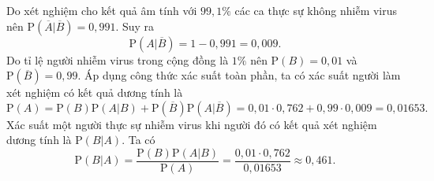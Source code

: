 \begin{vd}
{		Do xét nghiệm cho kết quả âm tính với $99,1\%$ các ca thực sự không nhiễm virus nên
		$\mathrm{P}(\overline{A}|\overline{B})=0{,}991$. Suy ra $$\mathrm{P}(A|\overline{B})=1-0{,}991=0{,}009.$$
		Do tỉ lệ người nhiễm virus trong cộng đồng là $1\%$ nên $\mathrm{P}(B)=0,01$ và $\mathrm{P}(\overline{B}) = 0,99$.
		Áp dụng công thức xác suất toàn phần, ta có xác suất người làm xét nghiệm có kết quả
		dương tính là $$\mathrm{P}(A)=\mathrm{P}(B)\mathrm{P}(A|B)+\mathrm{P}(\overline{B})\mathrm{P}(A|\overline{B})=0{,}01\cdot0{,}762+0{,}99\cdot0{,}009=0{,}01653.$$
		Xác suất một người thực sự nhiễm virus khi người đó có kết quả xét nghiệm dương tính
		là $\mathrm{P}(B|A)$. Ta có $$\mathrm{P}(B|A)=\dfrac{\mathrm{P}(B)\mathrm{P}(A|B)}{\mathrm{P}(A)}=\dfrac{0{,}01\cdot0{,}762}{0{,}01653}\approx0{,}461.$$}
\end{vd}

